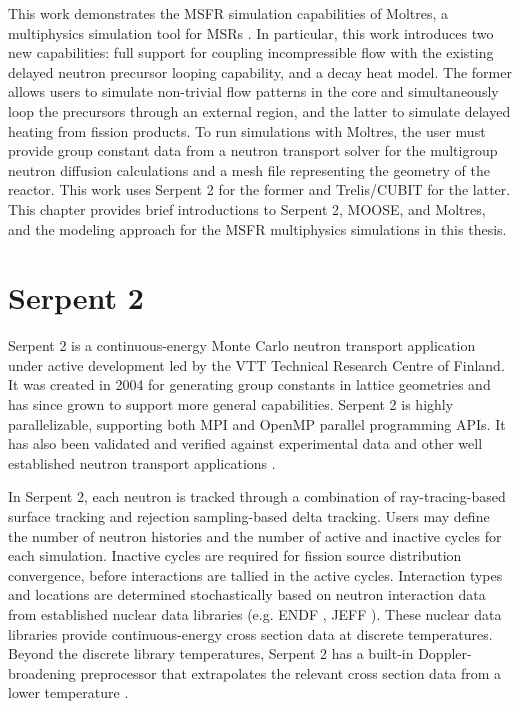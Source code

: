 This work demonstrates the \gls{MSFR} simulation capabilities of Moltres, a
multiphysics simulation tool for \glspl{MSR} \cite{lindsay_introduction_2018}.
In particular, this work introduces two new capabilities: full support
for coupling incompressible flow with the existing delayed neutron precursor
looping capability, and a decay heat model. The former allows users to
simulate non-trivial flow patterns in the core and simultaneously loop the
precursors through an external region, and the latter to simulate delayed
heating from fission products.
To run simulations with Moltres, the user must provide
group constant data from a neutron transport solver for the
multigroup neutron diffusion calculations and a mesh file representing the
geometry of the reactor. This work uses Serpent 2 \cite{leppanen_serpent_2014}
for the former and Trelis/CUBIT \cite{noauthor_trelis_2018} for the latter.
This chapter provides brief introductions to
Serpent 2, \gls{MOOSE}, and Moltres, and the modeling approach for the
\gls{MSFR} multiphysics simulations in this thesis.

\section{Serpent 2}

Serpent 2 \cite{leppanen_serpent_2014} is a continuous-energy Monte Carlo
neutron transport application under
active development led by the VTT Technical Research Centre of Finland. It was
created in 2004 for generating group constants in lattice geometries and has
since grown to support more general capabilities. Serpent 2 is highly
parallelizable, supporting both MPI and OpenMP parallel programming APIs. It
has also been validated and verified against experimental data and other well
established neutron transport applications \cite{leppanen_calculation_2014}.

In Serpent 2, each neutron is tracked through a combination of
ray-tracing-based surface tracking and rejection sampling-based delta
tracking. Users may define the number of neutron histories and the number of
active and inactive cycles for each
simulation. Inactive cycles are required for fission source distribution
convergence, before interactions are tallied in the active cycles.
Interaction types and locations are
determined stochastically based on neutron interaction data from established
nuclear data libraries (e.g. ENDF \cite{chadwick_endf/b-vii.1_2011}, JEFF
\cite{oecd/nea_jeff-3.1.2_2014}). These nuclear data libraries provide
continuous-energy cross section data at discrete temperatures. Beyond the
discrete library temperatures, Serpent 2 has a built-in Doppler-broadening
preprocessor that extrapolates the relevant cross section data from a lower
temperature \cite{leppanen_serpent_2014}.

